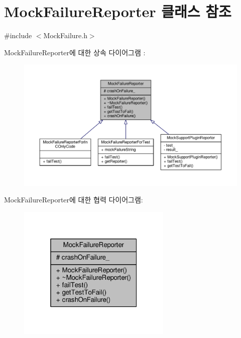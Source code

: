 \hypertarget{class_mock_failure_reporter}{}\section{Mock\+Failure\+Reporter 클래스 참조}
\label{class_mock_failure_reporter}


{\ttfamily \#include $<$Mock\+Failure.\+h$>$}



Mock\+Failure\+Reporter에 대한 상속 다이어그램 \+: 
\nopagebreak
\begin{figure}[H]
\begin{center}
\leavevmode
\includegraphics[width=350pt]{class_mock_failure_reporter__inherit__graph}
\end{center}
\end{figure}


Mock\+Failure\+Reporter에 대한 협력 다이어그램\+:
\nopagebreak
\begin{figure}[H]
\begin{center}
\leavevmode
\includegraphics[width=208pt]{class_mock_failure_reporter__coll__graph}
\end{center}
\end{figure}

